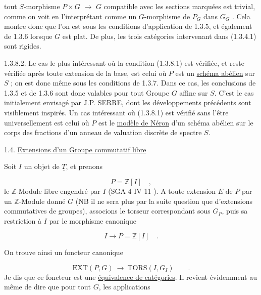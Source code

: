 


 tout $S$-morphisme $P\times G$ $\longrightarrow$ $G$ compatible avec les sections marquées est trivial, comme on voit en l'interprétant comme un $G$-morphisme de $P_G$ dans $G_G$ . Cela montre donc que l'on est sous les conditions d'application de 1.3.5, et également de 1.3.6 lorsque $G$ est plat. De plus, les trois catégories intervenant dans (1.3.4.1) sont rigides.

1.3.8.2.  Le cas le plus intéressant où la condition (1.3.8.1) est vérifiée, et reste vérifiée après toute extension de la base, est celui où $P$ est un \underline{schéma abélien} sur $S$ ; on est donc même sous les conditions de 1.3.7. Dans ce cas, les conclusions de 1.3.5 et de 1.3.6 sont donc valables pour tout Groupe $G$ affine sur $S$. C'est le cas initialement envisagé par J.P. SERRE, dont les développements précédents sont visiblement inspirés. Un cas intéressant où (1.3.8.1) est vérifié sans l'être universellement est celui où $P$ est le \underline{modèle de Néron} d'un schéma abélien sur le corps des fractions d'un anneau de valuation discrète de spectre $S$.


1.4.  \underline{Extensions d'un Groupe commutatif libre}

Soit $I$ un objet de $\underline{T}$, et prenons

\begin{equation}\tag{1.4.1}
P = \mathbb{Z}[I] \quad ,
\end{equation}
le $\mathbb{Z}$-Module libre engendré par $I$ (SGA 4 IV 11 ). A toute extension $E$ de $P$ par un $\mathbb{Z}$-Module donné $G$ (NB il ne sera plus par la suite question que d'extensions commutatives de groupes), associons le torseur correspondant sous $G_P$, puis sa restriction à $I$ par le morphisme canonique

\begin{equation*}
I \longrightarrow P = \mathbb{Z}[I] \quad .
\end{equation*}


On trouve ainsi un foncteur canonique

\begin{equation}\tag{1.4.2}
\mathrm{EXT}(P,G) \ \longrightarrow\ \mathrm{TORS}(I,G_I) \qquad .
\end{equation}
Je dis que ce foncteur est une \underline{équivalence de catégories}. Il revient évidemment au même de dire que pour tout $G$, les applications

